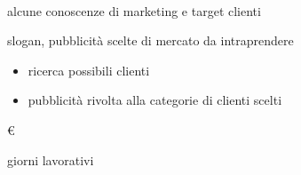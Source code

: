 \item[Responsabile:] \\

\item[Input:] alcune conoscenze di marketing e target clienti \\

\item[Output:] slogan, pubblicità scelte di mercato da intraprendere \\

\item[Attività:]
\begin{itemize}
\item ricerca possibili clienti
\item pubblicità rivolta alla categorie di clienti scelti
\end{itemize}
\item[Costo:] \euro \\
\item[Tempi di realizzazione:]  giorni lavorativi